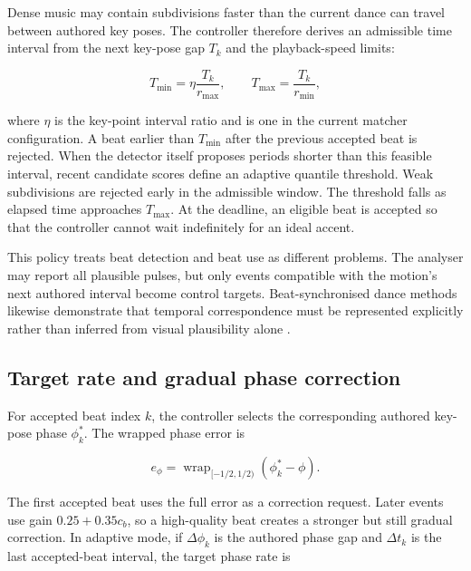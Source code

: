Dense music may contain subdivisions faster than the current dance can travel
between authored key poses. The controller therefore derives an admissible
time interval from the next key-pose gap $T_k$ and the playback-speed limits:

\begin{equation}
    T_{\min}=\eta\frac{T_k}{r_{\max}},
    \qquad
    T_{\max}=\frac{T_k}{r_{\min}},
    \label{eq:ch5_beat_time_window}
\end{equation}

where $\eta$ is the key-point interval ratio and is one in the current matcher
configuration. A beat earlier than $T_{\min}$ after the previous accepted beat
is rejected. When the detector itself proposes periods shorter than this
feasible interval, recent candidate scores define an adaptive quantile
threshold. Weak subdivisions are rejected early in the admissible window. The
threshold falls as elapsed time approaches $T_{\max}$. At the deadline, an
eligible beat is accepted so that the controller cannot wait indefinitely for
an ideal accent.

This policy treats beat detection and beat use as different problems. The
analyser may report all plausible pulses, but only events compatible with the
motion's next authored interval become control targets. Beat-synchronised dance
methods likewise demonstrate that temporal correspondence must be represented
explicitly rather than inferred from visual plausibility alone
\cite{huang2024beat}.

\subsection{Target rate and gradual phase correction}
\label{subsec:ch5_phase_correction}

For accepted beat index $k$, the controller selects the corresponding authored
key-pose phase $\phi_k^{*}$. The wrapped phase error is

\begin{equation}
    e_{\phi}=\operatorname{wrap}_{[-1/2,1/2)}
             \left(\phi_k^{*}-\phi\right).
    \label{eq:ch5_phase_error}
\end{equation}

The first accepted beat uses the full error as a correction request. Later
events use gain $0.25+0.35c_b$, so a high-quality beat creates a stronger but
still gradual correction. In adaptive mode, if $\Delta\phi_k$ is the authored
phase gap and $\Delta t_k$ is the last accepted-beat interval, the target phase
rate is

